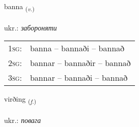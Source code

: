 \documentclass[frontgrid, backgrid]{flacards}\usepackage[]{graphicx}\usepackage[]{xcolor}
\begin{document}
\renewcommand{\flhead}{\vskip5pt \fboxsep=0pt {\small\bfseries\footnotesize Sagnorð | дієслово}}
\renewcommand{\fcfoot}{\vskip5pt \fboxsep=0pt \hspace{2pt}{\small\bfseries\footnotesize 2K}}

\renewcommand{\blhead}{\vskip5pt {\small\bfseries\footnotesize Sagnorð | дієслово }}
\renewcommand{\bcfoot}{\vskip5pt \hspace{2pt}{\small\bfseries\footnotesize 2K}}


{banna \small{\textsubscript{(\textit{v.})}} \\[1ex] %
\textphonetic{[pana]} \\
ukr.: \emph{забороняти} \\  [2ex]
\renewcommand*{\arraystretch}{0.8}
\begin{tabular}{p{1cm}l}
\textsc{1sg}: & banna -- bannaði -- bannað \\ 
\textsc{2sg}: & bannar -- bannaðir -- bannað \\ 
\textsc{3sg}: & bannar -- bannaði -- bannað \\ 
\end{tabular}
}

\renewcommand{\flhead}{\vskip5pt \fboxsep=0pt {\small\bfseries\footnotesize Nafnorð | іменник}}
\renewcommand{\fcfoot}{\vskip5pt \fboxsep=0pt \hspace{2pt}{\small\bfseries\footnotesize 2K}}

\renewcommand{\blhead}{\vskip5pt {\small\bfseries\footnotesize Nafnorð | іменник }}
\renewcommand{\bcfoot}{\vskip5pt \hspace{2pt}{\small\bfseries\footnotesize 2K}}


{virðing \small{\textsubscript{(\textit{f.})}} \\[1ex] %
\textphonetic{[vɪrðiŋk]} \\
ukr.: \emph{повага} \\  [2ex]
\renewcommand*{\arraystretch}{0.8}
}
\end{document}

